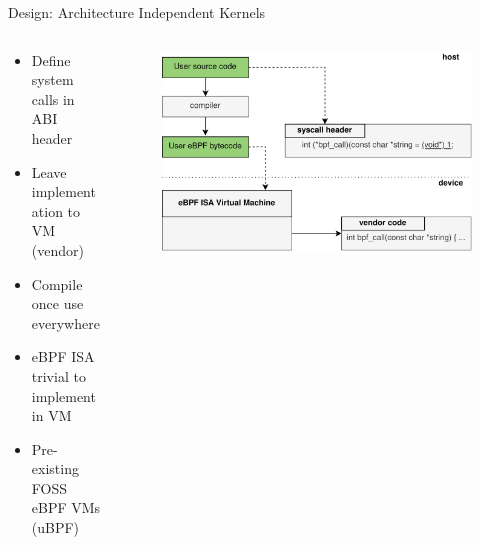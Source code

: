 \documentclass[aspectratio=169]{beamer}
\begin{document}

\begin{frame}{Design: Architecture Independent Kernels}
    \begin{columns}
        \begin{column}{0.45\textwidth}
            \footnotesize
            \begin{itemize}
                \item Define system calls in ABI header
                \item Leave implementation to VM (vendor)
                \item Compile once use everywhere
                \item eBPF ISA trivial to implement in VM
                \item Pre-existing FOSS eBPF VMs (uBPF)
            \end{itemize}
        \end{column}
        \begin{column}{0.55\textwidth}
            \begingroup
            \begin{figure}
                \centering
                \includegraphics[width=1\textwidth]{resources/images/ubpf-medium-design.png}
            \end{figure}
            \endgroup
        \end{column}
    \end{columns}
\end{frame}
\end{document}
